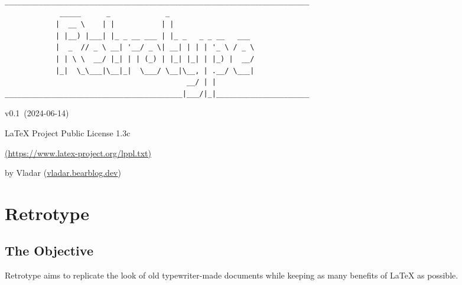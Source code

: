 \documentclass[english,12pt,openany,letterpaper]{book}
\def\author{Vladar}
\def\license{LaTeX Project Public License 1.3c}
\def\licenselink{https://www.latex-project.org/lppl.txt}
\def\rtVer{0.1}
\def\rtDate{2024-06-14}
\begin{document}

\begin{titlepage}

\begin{verbatim}
________________________________________________________________________
             _____      _             _                                 
            |  __ \    | |           | |                                
            | |__) |___| |_ _ __ ___ | |_ _   _ _ __   ___              
            |  _  // _ \ __| '__/ _ \| __| | | | '_ \ / _ \             
            | | \ \  __/ |_| | | (_) | |_| |_| | |_) |  __/             
            |_|  \_\___|\__|_|  \___/ \__|\__, | .__/ \___|             
                                           __/ | |
__________________________________________|___/|_|______________________
\end{verbatim}

{\hfill v\rtVer~(\rtDate)}

\vfill

\begin{adjustbox}{center}
\end{adjustbox}

\vfill
\vfill

{\hfill\license\hfill}

{\hfill\href{\licenselink}{(\licenselink)}\hfill}

{\hfill{}by \author{} (\href{https://vladar.bearblog.dev}{vladar.bearblog.dev})\hfill}

\end{titlepage}

\toc[3]

\chapter{Retrotype}

\clearBg
\clearFg

\rightbox{{\Large\itshape \rtDate}}

\skipline

\section{The Objective}

Retrotype aims to replicate the look of old typewriter-made documents while keeping as many benefits of LaTeX as possible.

\skipline
\end{document}

